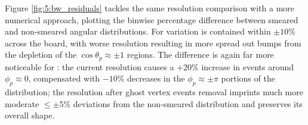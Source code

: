 Figure \ref{fig:5:bw_residuals} tackles the same resolution comparison with a more numerical approach, plotting the binwise percentage difference between smeared and non-smeared angular distributions.
For \cthetap variation is contained within $\pm 10\%$ across the board, with worse resolution resulting in more spread out bumps from the depletion of the $\cos\theta_p \approx \pm 1$ regions.
The difference is again far more noticeable for \phip: the current resolution causes a $+20\%$ increase in events around $\phi_p \approx 0$, compensated with $-10\%$ decreases in the $\phi_p \approx \pm \pi$ portions of the distribution;
the resolution after ghost vertex events removal imprints much more moderate $\leq \pm 5\%$ deviations from the non-smeared distribution and preserves its overall shape.